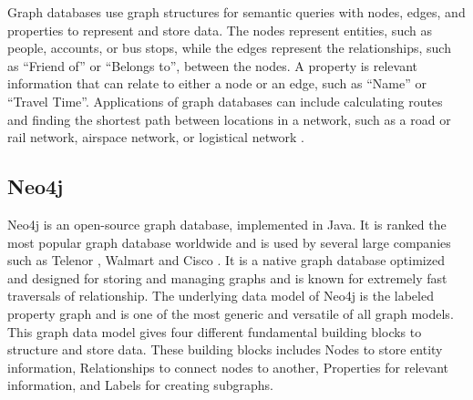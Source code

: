 

Graph databases use graph structures for semantic queries with nodes, edges, and properties to represent and store data.
The nodes represent entities, such as people, accounts, or bus stops, while the edges represent the relationships, such as ``Friend of'' or ``Belongs to'', between the nodes. A property is relevant information that can relate to either a node or an edge, such as ``Name'' or ``Travel Time''.
Applications of graph databases can include calculating routes and finding the shortest path between locations in a network, such as a road or rail network, airspace network, or logistical network \citep[p.102]{robinson13}. 

\subsection{Neo4j}
\label{subsubsec:neo4j}
Neo4j \citep{website:neo4j} is an open-source graph database, implemented in Java. It is ranked the most popular graph database worldwide \citep{website:graphdbranking} and is used by several large companies such as Telenor \citep{website:telenor}, Walmart \citep{website:walmart} and Cisco \citep{website:cisco}. It is a native graph database optimized and designed for storing and managing graphs and is known for extremely fast traversals of relationship. The underlying data model of Neo4j is the labeled property graph and is one of the most generic and versatile of all graph models\citep[p.73]{robinson13}. This graph data model gives four different fundamental building blocks to structure and store data. These building blocks includes Nodes to store entity information, Relationships to connect nodes to another, Properties for relevant information, and Labels for creating subgraphs.

